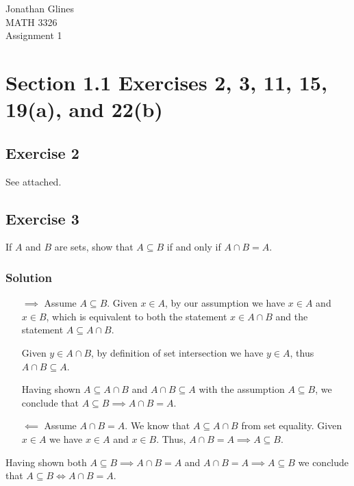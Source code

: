 \documentclass[12pt]{article}
\begin{document}
\begin{flushright}
{\Large
Jonathan Glines \\
MATH 3326 \\
Assignment 1 \\
}
\end{flushright}
\section*{Section 1.1 Exercises 2, 3, 11, 15, 19(a), and 22(b)}
\subsection*{Exercise 2}
See attached.
\subsection*{Exercise 3}
If $A$ and $B$ are sets, show that $A \subseteq B$ if and only if $A \cap B = A$.
\subsubsection*{Solution}
%
%

\begin{itemize}
\item[$\implies$] Assume $A \subseteq B$. Given $x \in A$, by our assumption we have $x \in A$ and $x \in B$, which is equivalent to both the statement $x \in A \cap B$ and the statement $A \subseteq A \cap B$.

Given $y \in A \cap B$, by definition of set intersection we have $y \in A$, thus $A \cap B \subseteq A$.

Having shown $A \subseteq A \cap B$ and $A \cap B \subseteq A$ with the assumption $A \subseteq B$, we conclude that $A \subseteq B \implies A \cap B = A$.

\item[$\impliedby$] Assume $A \cap B = A$. We know that $A \subseteq A \cap B$ from set equality. Given $x \in A$ we have $x \in A$ and $x \in B$. Thus, $A \cap B = A \implies A \subseteq B$.
\end{itemize}
Having shown both $A \subseteq B \implies A \cap B = A$ and $A \cap B = A \implies A \subseteq B$ we conclude that $A \subseteq B \iff A \cap B = A$.
\end{document}
